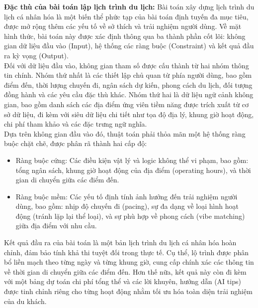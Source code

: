 
\textbf{Đặc thù của bài toán lập lịch trình du lịch:}
Bài toán xây dựng lịch trình du lịch cá nhân hóa là một biến thể phức tạp của bài toán định tuyến đa mục tiêu, được mở rộng thêm các yếu tố về sở thích và trải nghiệm người dùng. Về mặt hình thức, bài toán này được xác định thông qua ba thành phần cốt lõi: không gian dữ liệu đầu vào (Input), hệ thống các ràng buộc (Constraint) và kết quả đầu ra kỳ vọng (Output). \\
Đối với dữ liệu đầu vào, không gian tham số được cấu thành từ hai nhóm thông tin chính. Nhóm thứ nhất là các thiết lập chủ quan từ phía người dùng, bao gồm điểm đến, thời lượng chuyến đi, ngân sách dự kiến, phong cách du lịch, đối tượng đồng hành và các yêu cầu đặc thù khác. Nhóm thứ hai là dữ liệu ngữ cảnh không gian, bao gồm danh sách các địa điểm ứng viên tiềm năng được trích xuất từ cơ sở dữ liệu, đi kèm với siêu dữ liệu chi tiết như tọa độ địa lý, khung giờ hoạt động, chi phí tham khảo và các đặc trưng ngữ nghĩa. \\
Dựa trên không gian đầu vào đó, thuật toán phải thỏa mãn một hệ thống ràng buộc chặt chẽ, được phân rã thành hai cấp độ:
\begin{itemize}
    \item Ràng buộc cứng: Các điều kiện vật lý và logic không thể vi phạm, bao gồm: tổng ngân sách, khung giờ hoạt động của địa điểm (operating hours), và thời gian di chuyển giữa các điểm đến.
    \item Ràng buộc mềm: Các yếu tố định tính ảnh hưởng đến trải nghiệm người dùng, bao gồm: nhịp độ chuyến đi (pacing), sự đa dạng về loại hình hoạt động (tránh lặp lại thể loại), và sự phù hợp về phong cách (vibe matching) giữa địa điểm với nhu cầu.
\end{itemize}

Kết quả đầu ra của bài toán là một bản lịch trình du lịch cá nhân hóa hoàn chỉnh, đảm bảo tính khả thi tuyệt đối trong thực tế. Cụ thể, lộ trình được phân bổ liền mạch theo từng ngày và từng khung giờ, cung cấp chính xác các thông tin về thời gian di chuyển giữa các điểm đến. Hơn thế nữa, kết quả này còn đi kèm với một bảng dự toán chi phí tổng thể và các lời khuyên, hướng dẫn (AI tips) được tinh chỉnh riêng cho từng hoạt động nhằm tối ưu hóa toàn diện trải nghiệm của du khách.

